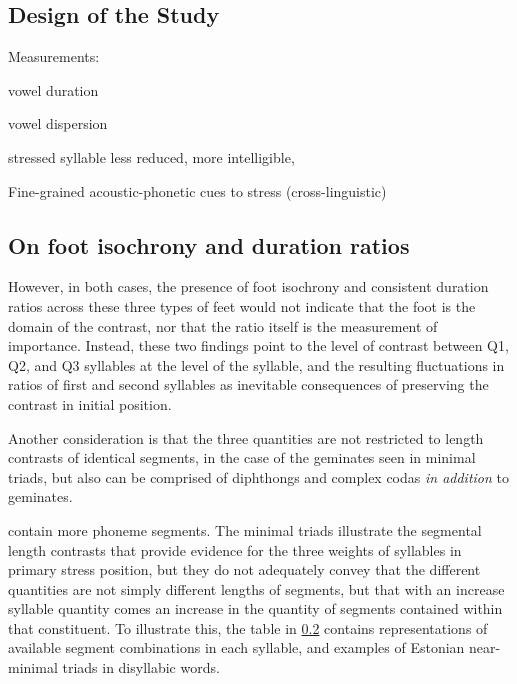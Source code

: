 \subsection{Design of the Study}

Measurements:

vowel duration

vowel dispersion

stressed syllable less reduced, more intelligible, 

Fine-grained acoustic-phonetic cues to stress (cross-linguistic) 
\cite{lindblom1990,moonInteractionDurationContext1994, de1995supraglottal, bradlowIntelligibilityNormalSpeech1996,smiljanicProductionPerceptionClear2005} \\
\subsection{On foot isochrony and duration ratios} 

However, in both cases, the presence of foot isochrony and consistent duration ratios across these three types of feet would not indicate that the foot is the domain of the contrast, nor that the ratio itself is the measurement of importance. Instead, these two findings point to the level of contrast between Q1, Q2, and Q3 syllables at the level of the syllable, and the resulting fluctuations in ratios of first and second syllables as inevitable consequences of preserving the contrast in initial position. 

Another consideration is that the three quantities are not restricted to length contrasts of identical segments, in the case of the geminates seen in minimal triads, but also can be comprised of diphthongs and complex codas {\it in addition} to geminates. 


contain more phoneme segments. The minimal triads illustrate the segmental length contrasts that provide evidence for the three weights of syllables in primary stress position, but they do not adequately convey that the different quantities are not simply different lengths of segments, but that with an increase syllable quantity comes an increase in the quantity of segments contained within that constituent. To illustrate this, the table in \ref{} contains representations of available segment combinations in each syllable, and examples of Estonian near-minimal triads in disyllabic words. 

